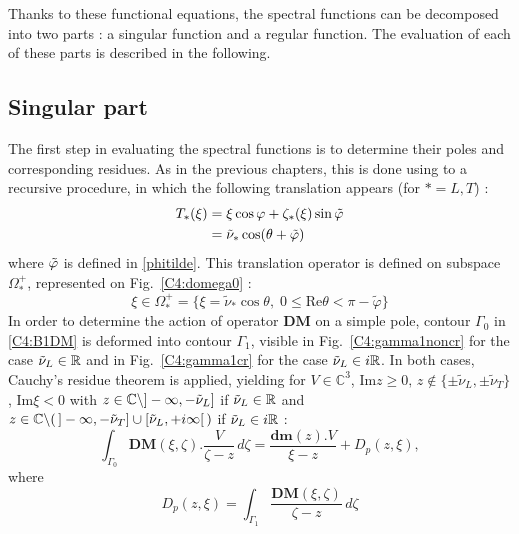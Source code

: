 Thanks to these functional equations, the spectral functions can be decomposed into two parts : a singular function and a regular function. The evaluation of each of these parts is described in the following.

\subsection{Singular part}
\label{C4:singpart}
The first step in evaluating the spectral functions is to determine their poles and corresponding residues. As in the previous chapters, this is done using to a recursive procedure, in which the following translation appears (for $*=L,T$) :
\begin{equation}
\begin{split}
T_*(\xi)&=\xi \cos \varphi+\zeta_*(\xi)\sin \tilde{\varphi} \\
&=\tilde{\nu}_*\cos(\theta+\tilde{\varphi})
\end{split}
\end{equation}
where $\tilde{\varphi}$ is defined in \eqref{phitilde}. This translation operator is defined on subspace $\Omega_*^+$, represented on Fig.~\ref{C4:domega0} :
\begin{equation}
\xi \in \Omega_*^+= \{ \xi=\tilde{\nu}_* \cos \theta, \; 0 \leq \mbox{Re} \theta < \pi-\tilde{\varphi} \}
\label{C4:defOmega0}
\end{equation}
In order to determine the action of operator $\mathbf{DM}$ on a simple pole, contour $\Gamma_0$ in \eqref{C4:B1DM} is deformed into contour $\Gamma_1$, visible in Fig.~\ref{C4:gamma1noncr} for the case $\tilde{\nu}_L \in \mathbb{R}$ and in Fig.~\ref{C4:gamma1cr} for the case $\tilde{\nu}_L \in i\mathbb{R}$. In both cases, Cauchy's residue theorem is applied, yielding for $V \in \mathbb{C}^3$, Im$z\geq 0, \, z \notin \{\pm\tilde{\nu}_L,\pm\tilde{\nu}_T \}$, Im$\xi <0 $ with $z\in \mathbb{C} \backslash  \rbrack - \infty, -\tilde{\nu}_L \rbrack$ if $\tilde{\nu}_L \in \mathbb{R}$ and $ z\in \mathbb{C} \backslash ( \, \rbrack - \infty, -\tilde{\nu}_T \rbrack \cup \lbrack \tilde{\nu}_L,+i\infty \lbrack \,)$ if $\tilde{\nu}_L \in i\mathbb{R}$ :
\begin{equation}
\int_{\Gamma_0} \textbf{DM}(\xi,\zeta).\frac{V}{\zeta-z}\,d\zeta = \frac{\textbf{dm}(z).V}{\xi-z}+D_p(z,\xi),
\label{C4:GaussDM}
\end{equation}
where
\begin{equation}
D_p(z,\xi)= \int_{\Gamma_1} \frac{\textbf{DM}(\xi,\zeta)}{\zeta-z}\,d\zeta
\label{C4:defDp}
\end{equation}

